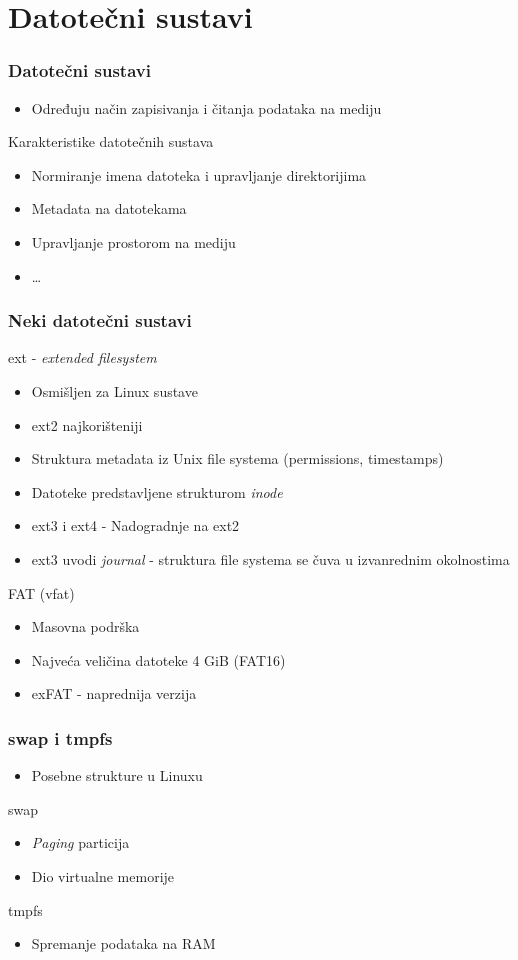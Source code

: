 \section{Datotečni sustavi}
\begin{frame}
	\frametitle{Datotečni sustavi}
	\begin{itemize}
		\item Određuju način zapisivanja i čitanja podataka na mediju
	\end{itemize}
	Karakteristike datotečnih sustava
	\begin{itemize}
		\item Normiranje imena datoteka i upravljanje direktorijima
		\item Metadata na datotekama
		\item Upravljanje prostorom na mediju
		\item \dots
	\end{itemize}
\end{frame}

\begin{frame}
	\frametitle{Neki datotečni sustavi}
	ext - \emph{extended filesystem}
	\begin{itemize}
		\item Osmišljen za Linux sustave
		\item ext2 najkorišteniji
		\item Struktura metadata iz Unix file systema (permissions, timestamps)
		\item Datoteke predstavljene strukturom \emph{inode}
		\item ext3 i ext4 - Nadogradnje na ext2
		\item ext3 uvodi \emph{journal} - struktura file systema se čuva u izvanrednim okolnostima
	\end{itemize}
	FAT (vfat)\
	\begin{itemize}
		\item Masovna podrška
		\item Najveća veličina datoteke 4 GiB (FAT16)
		\item exFAT - naprednija verzija
	\end{itemize}
\end{frame}

\begin{frame}
	\frametitle{swap i tmpfs}
	\begin{itemize}
		\item Posebne strukture u Linuxu
	\end{itemize}
	swap
	\begin{itemize}
		\item \emph{Paging} particija
		\item Dio virtualne memorije
	\end{itemize}
	tmpfs
	\begin{itemize}
		\item Spremanje podataka na RAM
	\end{itemize}
\end{frame}


